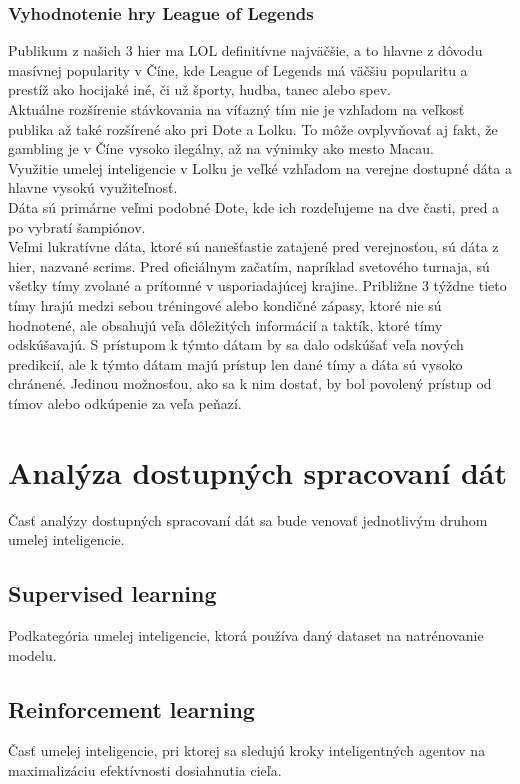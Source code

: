 \subsubsection{Vyhodnotenie hry League of Legends}

Publikum z našich 3 hier ma LOL definitívne najväčšie, a to hlavne z dôvodu masívnej popularity v Číne, kde League of Legends má väčšiu popularitu a prestíž ako hocijaké iné, či už športy, hudba, tanec alebo spev. \cite{chinalol} 
\\
Aktuálne rozšírenie stávkovania na víťazný tím nie je vzhľadom na veľkosť publika až také rozšírené ako pri Dote a Lolku. To môže ovplyvňovať aj fakt, že gambling je v Číne vysoko ilegálny, až na výnimky ako mesto Macau.\cite{chinagambling}
\\
Využitie  umelej inteligencie v Lolku je veľké vzhľadom na verejne dostupné dáta a hlavne vysokú využiteľnosť.
\\
Dáta sú primárne veľmi podobné Dote, kde ich rozdeľujeme na dve časti, pred a po vybratí šampiónov.
\\
Veľmi lukratívne dáta, ktoré sú nanešťastie zatajené pred verejnosťou, sú dáta z hier, nazvané scrims. Pred oficiálnym začatím, napríklad svetového turnaja, sú všetky tímy zvolané a prítomné v usporiadajúcej krajine. Približne 3 týždne tieto tímy hrajú medzi sebou tréningové alebo kondičné zápasy, ktoré nie sú hodnotené, ale obsahujú veľa dôležitých informácií a taktík, ktoré tímy odskúšavajú. S prístupom k týmto dátam by sa dalo odskúšať veľa nových predikcií, ale k týmto dátam majú prístup len dané tímy a dáta sú vysoko chránené. Jedinou možnosťou, ako sa k nim dostať, by bol povolený prístup od tímov alebo odkúpenie za veľa peňazí.
\\


\section{Analýza dostupných spracovaní dát}
Časť analýzy dostupných spracovaní dát sa bude venovať jednotlivým druhom umelej inteligencie.

\subsection{Supervised learning}
Podkategória umelej inteligencie, ktorá používa daný dataset na natrénovanie modelu.

\subsection{Reinforcement learning}
Časť umelej inteligencie, pri ktorej sa sledujú kroky inteligentných agentov na maximalizáciu efektívnosti dosiahnutia cieľa.
